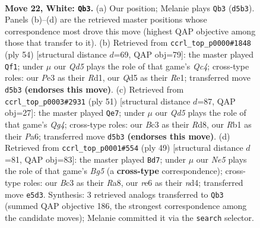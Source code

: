 \documentclass[11pt]{article}
\begin{document}
\clearpage

\begin{figure}[p]\centering
\begin{subfigure}{0.46\textwidth}\centering
\resizebox{\linewidth}{!}{%
\newchessgame
\chessboard[
  setfen={rnb1q1k1/1p4pp/4r3/p2QNp2/8/2B1P1P1/P4P1P/1R2R1K1 w - - 1 22},
  showmover=false,
  pgfstyle=straightmove, color=movearrow, markmove={d5-b3}
]}
\caption{}
\end{subfigure}\hfill
\begin{subfigure}{0.46\textwidth}\centering
\resizebox{\linewidth}{!}{%
\newchessgame
\chessboard[
  setfen={1rq1r1k1/p4pp1/7p/2b5/P1QN1n2/2P1p3/1P4PP/3RR1BK w - - 4 28},
  showmover=false,
  pgfstyle=straightmove, color=movearrow, markmove={c4-f1}
]}
\caption{}
\end{subfigure}
\\[4pt]
\begin{subfigure}{0.46\textwidth}\centering
\resizebox{\linewidth}{!}{%
\newchessgame
\chessboard[
  setfen={3rr1k1/1p1n1ppp/p1n5/6q1/3PPN2/P4Q2/1B4R1/5RK1 b - - 1 26},
  showmover=false,
  pgfstyle=straightmove, color=movearrow, markmove={g5-e7}
]}
\caption{}
\end{subfigure}\hfill
\begin{subfigure}{0.46\textwidth}\centering
\resizebox{\linewidth}{!}{%
\newchessgame
\chessboard[
  setfen={r3r1k1/p4p1p/6p1/4q3/3N1nb1/Q3BP2/P5PP/3RR1K1 b - - 0 25},
  showmover=false,
  pgfstyle=straightmove, color=movearrow, markmove={g4-d7}
]}
\caption{}
\end{subfigure}
\caption{\textbf{Move 22, White: \texttt{Qb3}.} (a) Our position; Melanie plays \texttt{Qb3} (\texttt{d5b3}). Panels (b)--(d) are the retrieved master positions whose correspondence most drove this move (highest QAP objective among those that transfer to it). (b) Retrieved from \texttt{ccrl\_top\_p0000\#1848} (ply 54) [structural distance $d$=69, QAP obj=79]: the master played \texttt{Qf1}; under $\mu$ our \emph{Qd5} plays the role of that game's \emph{Qc4}; cross-type roles: our \emph{P}e3 as their \emph{R}d1, our \emph{Q}d5 as their \emph{R}e1; transferred move \texttt{d5b3} \textbf{(endorses this move)}. (c) Retrieved from \texttt{ccrl\_top\_p0003\#2931} (ply 51) [structural distance $d$=87, QAP obj=27]: the master played \texttt{Qe7}; under $\mu$ our \emph{Qd5} plays the role of that game's \emph{Qg4}; cross-type roles: our \emph{B}c3 as their \emph{R}d8, our \emph{R}b1 as their \emph{P}a6; transferred move \texttt{d5b3} \textbf{(endorses this move)}. (d) Retrieved from \texttt{ccrl\_top\_p0001\#554} (ply 49) [structural distance $d$=81, QAP obj=83]: the master played \texttt{Bd7}; under $\mu$ our \emph{Ne5} plays the role of that game's \emph{Bg5} (a \textbf{cross-type} correspondence); cross-type roles: our \emph{B}c3 as their \emph{R}a8, our \emph{r}e6 as their \emph{n}d4; transferred move \texttt{e5d3}. Synthesis: 3 retrieved analogs transferred to \texttt{Qb3} (summed QAP objective 186, the strongest correspondence among the candidate moves); Melanie committed it via the \texttt{search} selector.}
\label{fig:thought-m42}
\end{figure}
\end{document}

